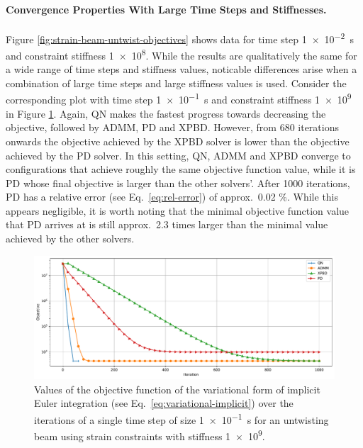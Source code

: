 \paragraph{Convergence Properties With Large Time Steps and Stiffnesses.}
Figure \ref{fig:strain-beam-untwist-objectives} shows data for time step \SI{1e-2}{\second} and constraint stiffness \num{1e8}. While the results are qualitatively 
the same for a wide range of time steps and stiffness values, noticable differences arise when a combination of large time steps and large stiffness values is used.
Consider the corresponding plot with time step \SI{1e-1}{\second} and constraint stiffness \num{1e9} in Figure \ref{fig:strain-beam-untwist-objectives-large-ts}. Again,
QN makes the fastest progress towards decreasing the objective, followed by ADMM, PD and XPBD. However, from 680 iterations onwards the objective achieved by the XPBD 
solver is lower than the objective achieved by the PD solver. In this setting, QN, ADMM and XPBD converge to configurations that achieve roughly the same objective 
function value, while it is PD whose final objective is larger than the other solvers'. After 1000 iterations, PD has a relative error (see Eq.\ \ref{eq:rel-error}) 
of approx.\ 0.02 \%. While this appears negligible, it is worth noting that the minimal objective function value that PD arrives at is still approx.\ 2.3 
times larger than the minimal value achieved by the other solvers.


\begin{figure}[h]
    \includegraphics[width=\textwidth]{figures/strain_beam_untwist_objectives_large_ts.pdf}
    \caption{Values of the objective function of the variational form of implicit Euler integration (see Eq.\ \ref{eq:variational-implicit}) over the iterations of a single time 
        step of size \SI{1e-1}{\second} for an untwisting beam using strain constraints with stiffness \num{1e9}.}
    \label{fig:strain-beam-untwist-objectives-large-ts}
\end{figure}

